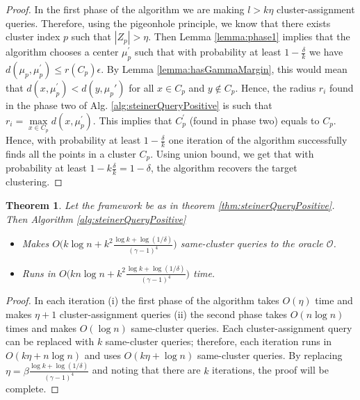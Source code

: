 \documentclass{article}
\newcommand{\mc}{\mathcal}
\newtheorem{theorem}{Theorem}
\begin{document}
\begin{proof}
In the first phase of the algorithm we are making $l>k\eta$ cluster-assignment queries. Therefore, using the pigeonhole principle, we know that there exists cluster index $p$ such that $|Z_p| > \eta$. Then Lemma \ref{lemma:phase1} implies that the algorithm chooses a center $\mu_p^\prime$ such that with probability at least $1-\frac{\delta}{k}$ we have $d(\mu_p, \mu_p^\prime) \le r(C_p)\epsilon$. By Lemma \ref{lemma:hasGammaMargin}, this would mean that $d(x, \mu_p^\prime) < d(y, \mu_p')$ for all $x \in C_p$ and $y \not\in C_p$. Hence, the radius $r_i$ found in the phase two of Alg. \ref{alg:steinerQueryPositive} is such that $r_{i} = \max\limits_{x \in C_p} d(x, \mu_p^\prime)$. This implies that $C_p^\prime$ (found in phase two) equals to $C_p$. Hence, with probability at least $1-\frac{\delta}{k}$ one iteration of the algorithm successfully finds all the points in a cluster $C_p$. Using union bound, we get that with probability at least $1-k\frac{\delta}{k} = 1-\delta$, the algorithm recovers the target clustering.
\end{proof}

\begin{theorem}
\label{thm:steinerQueryPositiveComplexity}
Let the framework be as in theorem \ref{thm:steinerQueryPositive}. Then Algorithm \ref{alg:steinerQueryPositive} 
\begin{itemize}[nolistsep,noitemsep]
\item Makes $O\big(k\log n + k^2\frac{\log k + \log (1/\delta)}{(\gamma - 1)^4}\big)$ same-cluster queries to the oracle $\mc O$.
\item Runs in $O\big(kn\log n + k^2\frac{\log k + \log (1/\delta)}{(\gamma - 1)^4}\big)$ time.
\end{itemize}
\end{theorem}

\begin{proof}
In each iteration (i) the first phase of the algorithm takes $O(\eta)$ time and makes $\eta+1$ cluster-assignment queries (ii) the second phase takes $O(n\log n)$ times and makes $O(\log n)$ same-cluster queries. Each cluster-assignment query can be replaced with $k$ same-cluster queries; therefore, each iteration runs in $O(k\eta + n\log n)$ and uses $O(k\eta + \log n)$ same-cluster queries. By replacing $\eta = \beta\frac{\log k + \log(1/\delta)}{(\gamma-1)^4}$ and noting that there are $k$ iterations, the proof will be complete.
\end{proof}
\end{document}

